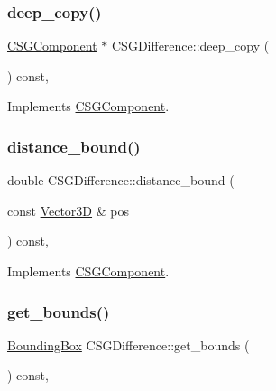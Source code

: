\subsubsection{\texorpdfstring{deep\_copy()}{deep\_copy()}}
{\footnotesize\ttfamily \mbox{\hyperlink{classCSGComponent}{C\+S\+G\+Component}} $\ast$ C\+S\+G\+Difference\+::deep\+\_\+copy (\begin{DoxyParamCaption}{ }\end{DoxyParamCaption}) const\hspace{0.3cm}{\ttfamily [override]}, {\ttfamily [virtual]}}



Implements \mbox{\hyperlink{classCSGComponent_a98d3accd23c28259cbf490f4d7acbe83}{C\+S\+G\+Component}}.

\mbox{\label{classCSGDifference_a66e0be492572f75b508a77c429be8fd8}} 
\subsubsection{\texorpdfstring{distance\_bound()}{distance\_bound()}}
{\footnotesize\ttfamily double C\+S\+G\+Difference\+::distance\+\_\+bound (\begin{DoxyParamCaption}\item[{const \mbox{\hyperlink{classVector3D}{Vector3D}} \&}]{pos }\end{DoxyParamCaption}) const\hspace{0.3cm}{\ttfamily [override]}, {\ttfamily [virtual]}}



Implements \mbox{\hyperlink{classCSGComponent_a41ca7aff9b7c481ea076f81eeb826779}{C\+S\+G\+Component}}.

\mbox{\label{classCSGDifference_aede15cd9fd46e4824e66361eb2f28ec9}} 
\subsubsection{\texorpdfstring{get\_bounds()}{get\_bounds()}}
{\footnotesize\ttfamily \mbox{\hyperlink{classBoundingBox}{Bounding\+Box}} C\+S\+G\+Difference\+::get\+\_\+bounds (\begin{DoxyParamCaption}{ }\end{DoxyParamCaption}) const\hspace{0.3cm}{\ttfamily [override]}, {\ttfamily [virtual]}}



